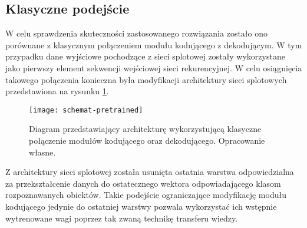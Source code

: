 \subsection{Klasyczne podejście}
W celu sprawdzenia skuteczności zastosowanego rozwiązania zostało ono porównane z klasycznym połączeniem modułu kodującego z dekodującym. W tym przypadku dane wyjściowe pochodzące z sieci splotowej zostały wykorzystane jako pierwszy element sekwencji wejściowej sieci rekurencyjnej. W celu osiągnięcia takowego połączenia konieczna była modyfikacji architektury sieci splotowych przedstawiona na rysunku \ref{fig:schemat-pretrained}.
\begin{figure}[H]
    \centering
    \texttt{[image: schemat-pretrained]}
    \caption{Diagram przedstawiający architekturę wykorzystującą klasyczne połączenie modułów kodującego oraz dekodującego. Opracowanie własne.}
    \label{fig:schemat-pretrained}
\end{figure}
\noindent Z architektury sieci splotowej została usunięta ostatnia warstwa odpowiedzialna za przekształcenie danych do ostatecznego wektora odpowiadającego klasom rozpoznawanych obiektów. Takie podejście ograniczające modyfikację modułu kodującego jedynie do ostatniej warstwy pozwala wykorzystać ich wstępnie wytrenowane wagi poprzez tak zwaną technikę transferu wiedzy.
